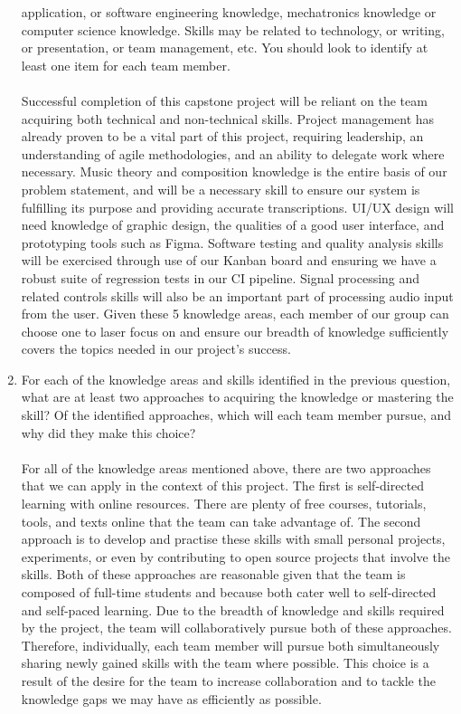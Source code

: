 \begin{enumerate}
  application, or software engineering knowledge, mechatronics knowledge or
  computer science knowledge.  Skills may be related to technology, or writing,
  or presentation, or team management, etc.  You should look to identify at
  least one item for each team member. \\ \\
  Successful completion of this capstone project will be reliant on the team acquiring both technical and non-technical skills. Project management has already proven to be a vital part of this project, requiring leadership, an understanding of agile methodologies, and an ability to delegate work where necessary. Music theory and composition knowledge is the entire basis of our problem statement, and will be a necessary skill to ensure our system is fulfilling its purpose and providing accurate transcriptions. UI/UX design will need knowledge of graphic design, the qualities of a good user interface, and prototyping tools such as Figma. Software testing and quality analysis skills will be exercised through use of our Kanban board and ensuring we have a robust suite of regression tests in our CI pipeline. Signal processing and related controls skills will also be an important part of processing audio input from the user. Given these 5 knowledge areas, each member of our group can choose one to laser focus on and ensure our breadth of knowledge sufficiently covers the topics needed in our project's success.\\
  \item For each of the knowledge areas and skills identified in the previous
  question, what are at least two approaches to acquiring the knowledge or
  mastering the skill?  Of the identified approaches, which will each team
  member pursue, and why did they make this choice? \\ \\
  For all of the knowledge areas mentioned above, there are two approaches that we can apply in the context of this project. The first is self-directed learning with online resources. There are plenty of free courses, tutorials, tools, and texts online that the team can take advantage of. The second approach is to develop and practise these skills with small personal projects, experiments, or even by contributing to open source projects that involve the skills. Both of these approaches are reasonable given that the team is composed of full-time students and because both cater well to self-directed and self-paced learning. Due to the breadth of knowledge and skills required by the project, the team will collaboratively pursue both of these approaches. Therefore, individually, each team member will pursue both simultaneously sharing newly gained skills with the team where possible. This choice is a result of the desire for the team to increase collaboration and to tackle the knowledge gaps we may have as efficiently as possible. 
\end{enumerate}
